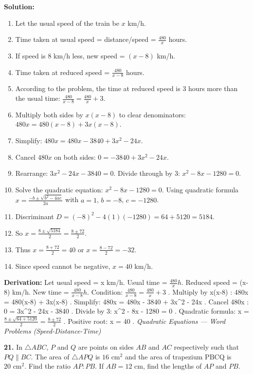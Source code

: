 \documentclass[12pt,a4paper]{exam}
\begin{document}
\begin{questions}
\textbf{Solution:}
\begin{enumerate}
  \item Let the usual speed of the train be $x$ km/h.
  \item Time taken at usual speed = distance/speed = $\frac{480}{x}$ hours.
  \item If speed is 8 km/h less, new speed = $(x - 8)$ km/h.
  \item Time taken at reduced speed = $\frac{480}{x - 8}$ hours.
  \item According to the problem, the time at reduced speed is 3 hours more than the usual time: $\frac{480}{x - 8} = \frac{480}{x} + 3$.
  \item Multiply both sides by $x(x - 8)$ to clear denominators: $480x = 480(x - 8) + 3x(x - 8)$.
  \item Simplify: $480x = 480x - 3840 + 3x^2 - 24x$.
  \item Cancel $480x$ on both sides: $0 = -3840 + 3x^2 - 24x$.
  \item Rearrange: $3x^2 - 24x - 3840 = 0$. Divide through by 3: $x^2 - 8x - 1280 = 0$.
  \item Solve the quadratic equation: $x^2 - 8x - 1280 = 0$. Using quadratic formula $x = \frac{-b \pm \sqrt{b^2 - 4ac}}{2a}$ with $a=1$, $b=-8$, $c=-1280$.
  \item Discriminant $D = (-8)^2 - 4(1)(-1280) = 64 + 5120 = 5184$.
  \item So $x = \frac{8 \pm \sqrt{5184}}{2} = \frac{8 \pm 72}{2}$.
  \item Thus $x = \frac{8 + 72}{2} = 40$ or $x = \frac{8 - 72}{2} = -32$.
  \item Since speed cannot be negative, $x = 40$ km/h.
\end{enumerate}
\textbf{Derivation:}
Let usual speed =  x  km/h. Usual time =  $\frac{480}{x}  h.$ Reduced speed =  (x-8)  km/h. New time =  $\frac{480}{x-8}  h.$ Condition:  $\frac{480}{x-8} = \frac{480}{x} + 3$ . Multiply by  x(x-8) :  480x = 480(x-8) + 3x(x-8) . Simplify:  480x = 480x - 3840 + 3x\textasciicircum{}2 - 24x . Cancel  480x :  0 = 3x\textasciicircum{}2 - 24x - 3840 . Divide by 3:  x\textasciicircum{}2 - 8x - 1280 = 0 . Quadratic formula:  x = $\frac{8 \pm \sqrt{64 + 5120}}{2} = \frac{8 \pm 72}{2}$ . Positive root:  x = 40 .
\hfill \textit{Quadratic Equations — Word Problems (Speed-Distance-Time)}
\vspace{0.3cm}

\question \textbf{21.} In $\triangle ABC$, $P$ and $Q$ are points on sides $AB$ and $AC$ respectively such that $PQ \parallel BC$. The area of $\triangle APQ$ is $16 \text{ cm}^2$ and the area of trapezium $\text{PBCQ}$ is $20 \text{ cm}^2$. Find the ratio $AP:PB$. If $AB = 12$ cm, find the lengths of $AP$ and $PB$.


\end{questions}
\end{document}
